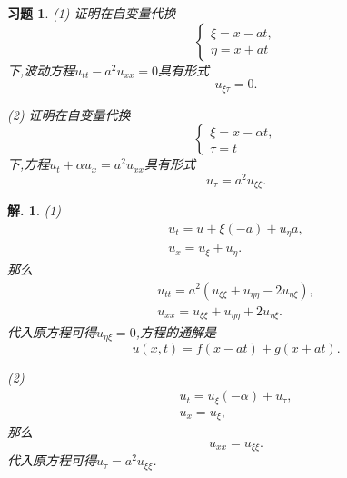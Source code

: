 \documentclass[a4paper,oneside,12pt]{ctexart}
\theoremstyle{plain}
\newtheorem{exercise}{习题}
\theoremstyle{nonumberplain}
\newtheorem{solution}{解.}
\theoremstyle{nonumberplain}
\begin{document}
    \begin{exercise}
        \label{ex:1.4}
        (1) 证明在自变量代换
        \begin{equation*}
            \begin{cases}
                \xi=x-at,\\
                \eta=x+at
            \end{cases}
        \end{equation*}
        下,波动方程$u_{tt}-a^2u_{xx}=0$具有形式
        \begin{equation*}
            u_{\xi\tau}=0.
        \end{equation*}

        (2) 证明在自变量代换
        \begin{equation*}
            \begin{cases}
                \xi=x-\alpha t,\\
                \tau=t
            \end{cases}
        \end{equation*}
        下,方程$u_t+\alpha u_x=a^2u_{xx}$具有形式 
        \begin{equation*}
            u_\tau=a^2 u_{\xi\xi}.
        \end{equation*}
    \end{exercise}

    \begin{solution}
        (1) \begin{gather*}
            u_t=u+\xi(-a)+u_\eta a,\\
            u_x=u_\xi+u_\eta.
        \end{gather*}
        那么 
        \begin{gather*}
            u_{tt}=a^2(u_{\xi\xi}+u_{\eta\eta}-2u_{\eta\xi}),\\
            u_{xx}=u_{\xi\xi}+u_{\eta\eta}+2u_{\eta\xi}.
        \end{gather*}
        代入原方程可得$u_{\eta\xi}=0$,方程的通解是 
        \begin{equation*}
            u(x,t)=f(x-at)+g(x+at).
        \end{equation*}

        (2) \begin{gather*}
            u_t=u_\xi(-\alpha)+u_\tau,\\
            u_x=u_\xi,
        \end{gather*}
        那么 
        \begin{equation*}
            u_{xx}=u_{\xi\xi}.
        \end{equation*}
        代入原方程可得$u_\tau=a^2 u_{\xi\xi}$.
    \end{solution}
\end{document}
